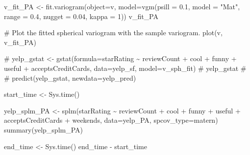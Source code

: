 \documentclass[
  12pt,
  letterpaper,
  DIV=11,
  numbers=noendperiod]{scrartcl}
\newenvironment{Shaded}{\begin{snugshade}}{\end{snugshade}}
\newcommand{\AttributeTok}[1]{\textcolor[rgb]{0.98,0.46,0.51}{#1}}
\newcommand{\CommentTok}[1]{\textcolor[rgb]{0.42,0.45,0.49}{#1}}
\newcommand{\DecValTok}[1]{\textcolor[rgb]{0.47,0.72,1.00}{#1}}
\newcommand{\FloatTok}[1]{\textcolor[rgb]{0.47,0.72,1.00}{#1}}
\newcommand{\FunctionTok}[1]{\textcolor[rgb]{0.70,0.57,0.94}{#1}}
\newcommand{\NormalTok}[1]{\textcolor[rgb]{0.88,0.89,0.91}{#1}}
\newcommand{\OtherTok}[1]{\textcolor[rgb]{0.70,0.57,0.94}{#1}}
\newcommand{\SpecialCharTok}[1]{\textcolor[rgb]{0.47,0.72,1.00}{#1}}
\newcommand{\StringTok}[1]{\textcolor[rgb]{0.62,0.80,1.00}{#1}}
\begin{document}
\begin{Shaded}
\begin{Highlighting}[]
\NormalTok{v\_fit\_PA }\OtherTok{\textless{}{-}} \FunctionTok{fit.variogram}\NormalTok{(}\AttributeTok{object=}\NormalTok{v, }
                           \AttributeTok{model=}\FunctionTok{vgm}\NormalTok{(}\AttributeTok{psill =} \FloatTok{0.1}\NormalTok{, }\AttributeTok{model =} \StringTok{"Mat"}\NormalTok{, }
                                     \AttributeTok{range =} \FloatTok{0.4}\NormalTok{, }\AttributeTok{nugget =} \FloatTok{0.04}\NormalTok{, }\AttributeTok{kappa =} \DecValTok{1}\NormalTok{))}
\NormalTok{v\_fit\_PA}

\CommentTok{\# Plot the fitted spherical variogram with the sample variogram.}
\FunctionTok{plot}\NormalTok{(v, v\_fit\_PA)}
\end{Highlighting}
\end{Shaded}

\begin{Shaded}
\begin{Highlighting}[]
\CommentTok{\# yelp\_gstat \textless{}{-} gstat(formula=starRating \textasciitilde{} reviewCount + cool + funny + useful + acceptsCreditCards, data=yelp\_sf, model=v\_sph\_fit)}
\CommentTok{\# yelp\_gstat}
\CommentTok{\# \# predict(yelp\_gstat, newdata=yelp\_pred)}
\end{Highlighting}
\end{Shaded}

\begin{Shaded}
\begin{Highlighting}[]
\NormalTok{start\_time }\OtherTok{\textless{}{-}} \FunctionTok{Sys.time}\NormalTok{()}


\NormalTok{yelp\_splm\_PA }\OtherTok{\textless{}{-}} \FunctionTok{splm}\NormalTok{(starRating }\SpecialCharTok{\textasciitilde{}}\NormalTok{ reviewCount }\SpecialCharTok{+}\NormalTok{ cool }\SpecialCharTok{+}\NormalTok{ funny }\SpecialCharTok{+}\NormalTok{ useful }\SpecialCharTok{+}\NormalTok{ acceptsCreditCards }\SpecialCharTok{+}\NormalTok{ weekends, }\AttributeTok{data=}\NormalTok{yelp\_PA, }\AttributeTok{spcov\_type=}\StringTok{\textquotesingle{}matern\textquotesingle{}}\NormalTok{)}
\FunctionTok{summary}\NormalTok{(yelp\_splm\_PA)}

\NormalTok{end\_time }\OtherTok{\textless{}{-}} \FunctionTok{Sys.time}\NormalTok{()}
\NormalTok{end\_time }\SpecialCharTok{{-}}\NormalTok{ start\_time}
\end{Highlighting}
\end{Shaded}
\end{document}
